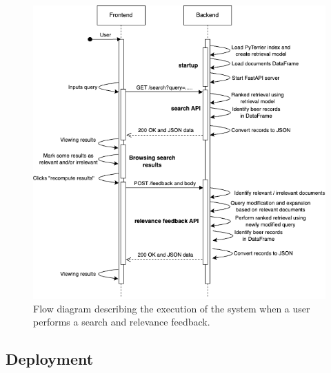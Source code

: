 \begin{figure}[H]
  \centering
  \includegraphics[width=1\textwidth]{img/3_implementation/search-flow.png}
  \caption{Flow diagram describing the execution of the system when a user performs a search and relevance feedback.}
  \label{fig:flow-diagram}
\end{figure}
\newpage


\subsection{Deployment}